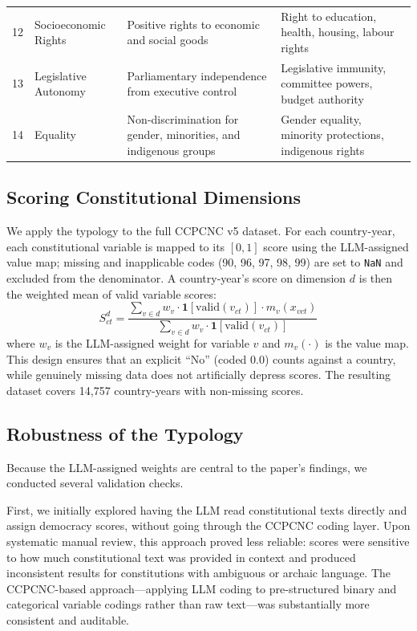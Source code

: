 \documentclass[9pt,twoside]{pnas-new}
\begin{document}
\begin{table}[t!]
\begin{tabular}{clp{3.8cm}p{3.8cm}}
12 & Socioeconomic Rights          & Positive rights to economic and social goods & Right to education, health, housing, labour rights \\
13 & Legislative Autonomy          & Parliamentary independence from executive control & Legislative immunity, committee powers, budget authority \\
14 & Equality                      & Non-discrimination for gender, minorities, and indigenous groups & Gender equality, minority protections, indigenous rights \\
\bottomrule
\end{tabular}
\end{table}

\subsection*{Scoring Constitutional Dimensions}

We apply the typology to the full CCPCNC v5 dataset. For each country-year, each constitutional variable is mapped to its $[0,1]$ score using the LLM-assigned value map; missing and inapplicable codes (90, 96, 97, 98, 99) are set to \texttt{NaN} and excluded from the denominator. A country-year's score on dimension $d$ is then the weighted mean of valid variable scores:
\begin{equation}
S_{ct}^{d} = \frac{\sum_{v \in d} w_v \cdot \mathbf{1}[\text{valid}(v_{ct})] \cdot m_v(x_{vct})}{\sum_{v \in d} w_v \cdot \mathbf{1}[\text{valid}(v_{ct})]}
\label{eq:score}
\end{equation}
where $w_v$ is the LLM-assigned weight for variable $v$ and $m_v(\cdot)$ is the value map. This design ensures that an explicit ``No'' (coded 0.0) counts against a country, while genuinely missing data does not artificially depress scores. The resulting dataset covers 14,757 country-years with non-missing scores.

\subsection*{Robustness of the Typology}

Because the LLM-assigned weights are central to the paper's findings, we conducted several validation checks.

First, we initially explored having the LLM read constitutional texts directly and assign democracy scores, without going through the CCPCNC coding layer. Upon systematic manual review, this approach proved less reliable: scores were sensitive to how much constitutional text was provided in context and produced inconsistent results for constitutions with ambiguous or archaic language. The CCPCNC-based approach---applying LLM coding to pre-structured binary and categorical variable codings rather than raw text---was substantially more consistent and auditable.
\end{document}
